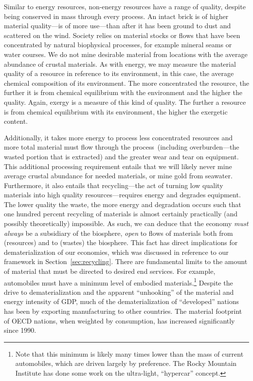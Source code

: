 Similar to energy resources, 
non-energy resources 
have a range of quality, despite being conserved
in mass through every process.
An intact brick is of higher material quality---is of more use---than
after it has been ground to dust and scattered on the wind.
Society relies on material stocks or flows 
that have been concentrated by natural biophysical processes,
for example mineral seams or water courses. 
We do not mine desirable material from locations with
the average abundance of crustal materials.
As with energy,
we may measure the material quality of a resource
in reference to its environment,
in this case,
the average chemical composition of
its environment.
The more concentrated the resource,
the further it is from chemical equilibrium
with the environment and the higher the quality.
Again, exergy is a measure of this kind of quality.
The further a resource is from chemical equilibrium
with its environment,
the higher the exergetic content.

Additionally,
it takes more energy to process less concentrated resources
and more total material must flow through 
the process~(including overburden---the wasted portion that is extracted)
and the greater wear and tear on equipment.
This additional processing requirement entails that 
we will likely never mine average crustal abundance for needed
materials, or mine gold from seawater.
Furthermore,
it also entails that recycling---the act
of turning low quality materials into
high quality resources---requires energy
and degrades equipment.
The lower quality the waste,
the more energy and degradation occurs
such that
one hundred percent recycling of materials
is almost certainly practically (and possibly theoretically) 
impossible.
As such, 
we can deduce that the economy \emph{must always} be
a subsidiary of the biosphere, \emph{open} to
flows of materials both from (resources) and 
to (wastes) the biosphere.
This fact has direct implications for dematerialization
of our economies, 
which was discussed in reference
to our framework in Section~\ref{sec:recycling}.
There are fundamental limits to the amount
of material that must be directed to desired
end services.
For example, automobiles 
must have a minimum level of embodied materials.\footnote{Note
that this minimum is likely many times lower than the 
mass of current automobiles,
which are driven largely by preference.
The Rocky Mountain Institute has done some
work on the ultra-light, 
``hypercar'' concept.\cite{RMI1996}}
Despite the drive to dematerialization
and the apparent ``unhooking'' of the
material and energy intensity of GDP,
much of the dematerialization of ``developed'' 
nations has been by exporting manufacturing
to other countries.\cite{allwood2012sustainable}
The material footprint of OECD nations, 
when weighted by consumption, 
has increased significantly since 1990.\cite{Wiedmann2013}

